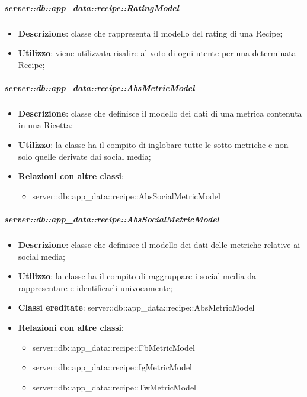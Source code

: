 		\subparagraph{server::db::app\_data::recipe::RatingModel} %
		\label{subp:server_db_app_data_recipe_recipemodel}
			\begin{itemize}
				\item \textbf{Descrizione}: classe che rappresenta il modello del rating di una Recipe;
				\item \textbf{Utilizzo}: viene utilizzata risalire al voto di ogni utente per una determinata Recipe;
			\end{itemize}


		\subparagraph{server::db::app\_data::recipe::AbsMetricModel} %
		\label{subp:server_db_app_data_recipe_absmetricmodel}
			\begin{itemize}
				\item \textbf{Descrizione}: classe che definisce il modello dei dati di una metrica contenuta in una Ricetta;
				\item \textbf{Utilizzo}: la classe ha il compito di inglobare tutte le sotto-metriche e non solo quelle derivate dai social media;
				\item \textbf{Relazioni con altre classi}:
					\begin{itemize}
						\item server::db::app\_data::recipe::AbsSocialMetricModel
					\end{itemize}
			\end{itemize}


		\subparagraph{server::db::app\_data::recipe::AbsSocialMetricModel} %
		\label{subp:server_db_app_data_recipe_abssocialmetricmodel}
			\begin{itemize}
				\item \textbf{Descrizione}: classe che definisce il modello dei dati delle metriche relative ai social media;
				\item \textbf{Utilizzo}: la classe ha il compito di raggruppare i social media da rappresentare e identificarli univocamente;
				\item \textbf{Classi ereditate}: server::db::app\_data::recipe::AbsMetricModel
				\item \textbf{Relazioni con altre classi}:
					\begin{itemize}
						\item server::db::app\_data::recipe::FbMetricModel
						\item server::db::app\_data::recipe::IgMetricModel
						\item server::db::app\_data::recipe::TwMetricModel
					\end{itemize}
			\end{itemize}


